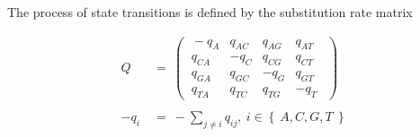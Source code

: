 
The process of state transitions is defined by the substitution rate matrix %

\begin{equation}
    \begin{align*}
        Q ~&=~
         \begin{pmatrix}
         ~-q_{A}   &   q_{AC}   &   q_{AG}   &   q_{AT}~~ \\
         ~q_{CA}   &  -q_{C}    &   q_{CG}   &   q_{CT}~~ \\
         ~q_{GA}   &   q_{GC}   &  -q_{G}    &   q_{GT}~~ \\
         ~q_{TA}   &   q_{TC}   &   q_{TG}   &  -q_{T}~~
         \end{pmatrix}
        \\ \\
        - q_{i} ~&=~ - \sum_{j \neq i} q_{ij}, ~ i \in \left\{~ A, C, G, T ~\right\}
    \end{align*}
\end{equation}

